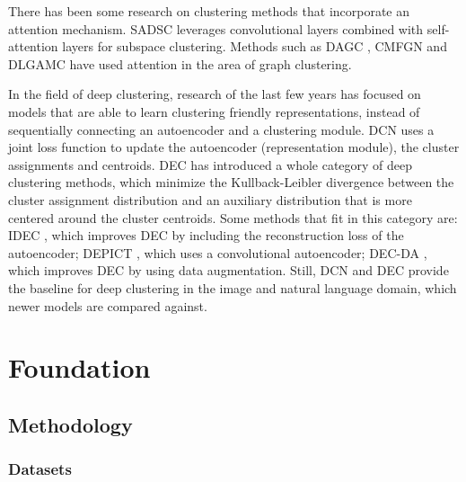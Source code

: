 There has been some research on clustering methods that incorporate an attention mechanism. SADSC \cite{sadsc} leverages convolutional layers combined with self-attention layers for subspace clustering. Methods such as DAGC \cite{dagc}, CMFGN \cite{cmfgn} and DLGAMC \cite{dlgamc} have used attention in the area of graph clustering.

In the field of deep clustering, research of the last few years has focused on models that are able to learn clustering friendly representations, instead of sequentially connecting an autoencoder and a clustering module. DCN \cite{dcn} uses a joint loss function to update the autoencoder (representation module), the cluster assignments and centroids. DEC \cite{dec} has introduced a whole category of deep clustering methods, which minimize the Kullback-Leibler divergence between the cluster assignment distribution and an auxiliary distribution that is more centered around the cluster centroids. Some methods that fit in this category are: IDEC \cite{idec}, which improves DEC by including the reconstruction loss of the autoencoder; DEPICT \cite{depict}, which uses a convolutional autoencoder; DEC-DA \cite{dec-da}, which improves DEC by using data augmentation. Still, DCN and DEC provide the baseline for deep clustering in the image and natural language domain, which newer models are compared against.

\chapter{Foundation}

\section{Methodology}

\subsection{Datasets} \label{Datasets}

